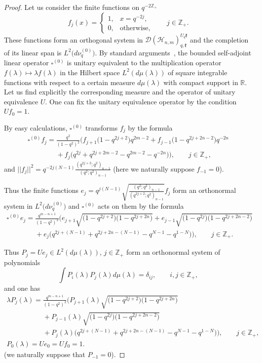 \documentclass[pdftex]{sigma}
\begin{document}
\begin{proof} Let us consider the f\/inite functions on $q^{-2\mathbb Z_+}$
\[
f_j(x)=
\begin{cases} 1, & x=q^{-2j},\\ 0, & \text{otherwise}, \end{cases}
\qquad j \in \mathbb Z_+.
\]
These functions form an orthogonal system in $\mathscr{D}(\mathscr{H}_{n,m})_{q,\mathfrak{k}}^{U_q \mathfrak{k}}$
and the completion of its linear span is $L^2\big(d\nu_q^{(0)}\big)$. By standard arguments~\cite{AG}, the bounded
self-adjoint linear operator $\square^{(0)}$ is unitary equivalent to the multiplication operator $f(\lambda)
\mapsto \lambda f(\lambda)$ in the Hilbert space $L^2(d\mu(\lambda))$ of square integrable functions with
respect to a certain measure $d\mu(\lambda)$ with compact support in $\mathbb R$. Let us f\/ind explicitly the
corresponding measure and the operator of unitary equivalence $U$. One can f\/ix the unitary equivalence
operator by the condition $Uf_0=1$.

By easy calculations, $\square^{(0)}$ transforms $f_j$ by the formula
\begin{gather*}
\square^{(0)}f_j=\frac{q^2}{(1-q^2)^2} \big( f_{j+1}\big(1-q^{2j+2}\big)q^{2m-2}+f_{j-1}\big(1-q^{2j+2n-2}\big)q^{-2n}\\
\phantom{\square^{(0)}f_j=}{} +f_j
\big(q^{2j}+q^{2j+2m-2}-q^{2m-2}-q^{-2n}\big)\big), \qquad j \in \mathbb Z_+,
\end{gather*}
and $||f_j||^2=q^{-2j(N-1)}\frac{(q^{2j+2};q^2)_{n-1}}{(q^2;q^2)_{n-1}}$ (here we naturally suppose
$f_{-1}=0$).

{\sloppy Thus the f\/inite functions $e_j=q^{j(N-1)}\sqrt{\frac{(q^{2};q^2)_{n-1}}{(q^{2j+2};q^2)_{n-1}}}f_j$ form an
orthonormal system in $L^2\big(d\nu_q^{(0)}\big)$ and $\square^{(0)}$ acts on them by the formula
\begin{gather*}
\square^{(0)}e_j=\frac{q^{m-n+1}}{(1-q^2)^2}\Big(
e_{j+1}\sqrt{\big(1-q^{2j+2}\big)\big(1-q^{2j+2n}\big)}+e_{j-1}\sqrt{\big(1-q^{2j}\big)\big(1-q^{2j+2n-2}\big)} \\
\phantom{\square^{(0)}e_j=}{}+e_j
\big(q^{2j+(N-1)}+q^{2j+2n-(N-1)}-q^{N-1}-q^{1-N}\big)\Big), \qquad j \in \mathbb Z_+.
\end{gather*}

}

Thus $P_j=Ue_j \in L^2(d\mu(\lambda))$, $j\in\mathbb{Z}_+$ form an orthonormal system of polynomials
\[
\int P_i(\lambda)P_j(\lambda)d\mu(\lambda)=\delta_{ij},\qquad i,j\in\mathbb{Z}_+,
\]
and one has{\samepage
\begin{gather}
\lambda P_j(\lambda)= \frac{q^{m-n+1}}{(1-q^2)^2}
\Big(P_{j+1}(\lambda)\sqrt{\big(1-q^{2j+2}\big)\big(1-q^{2j+2n}\big)}\nonumber\\
\phantom{\lambda P_j(\lambda)=}{}
 +P_{j-1} (\lambda) \sqrt{\big(1-q^{2j}\big)
\big(1-q^{2j+2n-2}\big)}\nonumber\\
\phantom{\lambda P_j(\lambda)=}{}
+P_j(\lambda) \big(q^{2j+(N-1)}+q^{2j+2n-(N-1)}-q^{N-1}-q^{1-N}\big)\Big), \qquad j \in \mathbb Z_+,\label{P_rec}
\\
\label{init_P0}
P_0(\lambda)=Ue_0=Uf_0=1.
\end{gather}
(we naturally suppose that $P_{-1}=0$).}


\end{proof}
\end{document}
